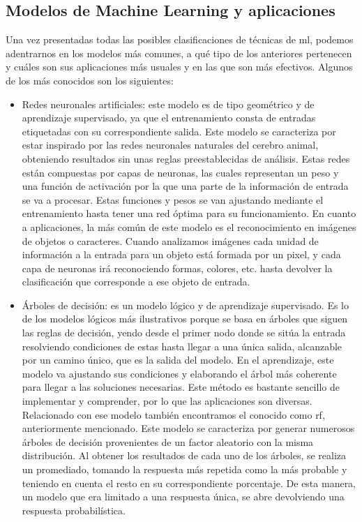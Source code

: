 \subsection{Modelos de Machine Learning y aplicaciones}
\par Una vez presentadas todas las posibles clasificaciones de técnicas de \gls{ml}, podemos adentrarnos en los modelos más comunes, a qué tipo de los anteriores pertenecen y cuáles son sus aplicaciones más usuales y en las que son más efectivos. Algunos de los más conocidos son los siguientes:
\begin{itemize}
	\item Redes neuronales artificiales: este modelo es de tipo geométrico y de aprendizaje supervisado, ya que el entrenamiento consta de entradas etiquetadas con su correspondiente salida. Este modelo se caracteriza por estar inspirado por las redes neuronales naturales del cerebro animal, obteniendo resultados sin unas reglas preestablecidas de análisis. Estas redes están compuestas por capas de neuronas, las cuales representan un peso y una función de activación por la que una parte de la información de entrada se va a procesar. Estas funciones y pesos se van ajustando mediante el entrenamiento hasta tener una red óptima para su funcionamiento. En cuanto a aplicaciones, la más común de este modelo es el reconocimiento en imágenes de objetos o caracteres. Cuando analizamos imágenes cada unidad de información a la entrada para un objeto está formada por un pixel, y cada capa de neuronas irá reconociendo formas, colores, etc. hasta devolver la clasificación que corresponde a ese objeto de entrada. 
	\item Árboles de decisión: es un modelo lógico y de aprendizaje supervisado. Es lo de los modelos lógicos más ilustrativos porque se basa en árboles que siguen las reglas de decisión, yendo desde el primer nodo donde se sitúa la entrada resolviendo condiciones de estas hasta llegar a una única salida, alcanzable por un camino único, que es la salida del modelo. En el aprendizaje, este modelo va ajustando sus condiciones y elaborando el árbol más coherente para llegar a las soluciones necesarias. Este método es bastante sencillo de implementar y comprender, por lo que las aplicaciones son diversas. Relacionado con ese modelo también encontramos el conocido como \gls{rf}, anteriormente mencionado. Este modelo se caracteriza por generar numerosos árboles de decisión provenientes de un factor aleatorio con la misma distribución. Al obtener los resultados de cada uno de los árboles, se realiza un promediado, tomando la respuesta más repetida como la más probable y teniendo en cuenta el resto en su correspondiente porcentaje. De esta manera, un modelo que era limitado a una respuesta única, se abre devolviendo una respuesta probabilística. 

\end{itemize}
